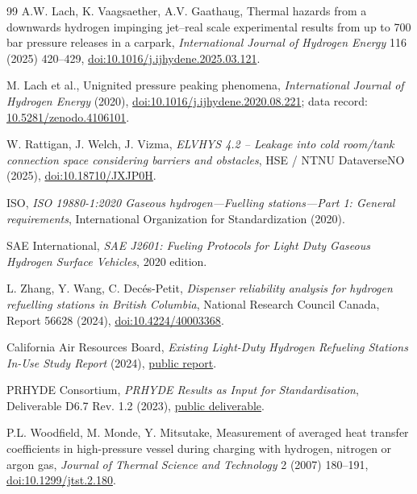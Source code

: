 \documentclass[12pt,a4paper]{article}
\begin{document}
\begin{thebibliography}{99}
A.W. Lach, K. Vaagsaether, A.V. Gaathaug, Thermal hazards from a downwards
hydrogen impinging jet--real scale experimental results from up to 700 bar
pressure releases in a carpark, \textit{International Journal of Hydrogen
Energy} 116 (2025) 420--429,
\href{https://doi.org/10.1016/j.ijhydene.2025.03.121}{doi:10.1016/j.ijhydene.2025.03.121}.

M. Lach et al., Unignited pressure peaking phenomena, \textit{International
Journal of Hydrogen Energy} (2020),
\href{https://doi.org/10.1016/j.ijhydene.2020.08.221}{doi:10.1016/j.ijhydene.2020.08.221};
data record: \href{https://doi.org/10.5281/zenodo.4106101}{10.5281/zenodo.4106101}.

W. Rattigan, J. Welch, J. Vizma, \textit{ELVHYS 4.2 -- Leakage into cold
room/tank connection space considering barriers and obstacles}, HSE / NTNU
DataverseNO (2025), \href{https://doi.org/10.18710/JXJP0H}{doi:10.18710/JXJP0H}.

ISO, \textit{ISO 19880-1:2020 Gaseous hydrogen---Fuelling stations---Part 1:
General requirements}, International Organization for Standardization (2020).

SAE International, \textit{SAE J2601: Fueling Protocols for Light Duty Gaseous
Hydrogen Surface Vehicles}, 2020 edition.

L. Zhang, Y. Wang, C. Dec\'es-Petit, \textit{Dispenser reliability analysis for
hydrogen refuelling stations in British Columbia}, National Research Council
Canada, Report 56628 (2024),
\href{https://doi.org/10.4224/40003368}{doi:10.4224/40003368}.

California Air Resources Board, \textit{Existing Light-Duty Hydrogen Refueling
Stations In-Use Study Report} (2024),
\href{https://ww2.arb.ca.gov/sites/default/files/2024-12/Existing\%20Light-Duty\%20Hydrogen\%20Refueling\%20Stations\%20In-Use\%20Study\%20Report\%20ADA\%20AL.pdf}{public report}.

PRHYDE Consortium, \textit{PRHYDE Results as Input for Standardisation},
Deliverable D6.7 Rev. 1.2 (2023),
\href{https://lbst.de/wp-content/uploads/2023/04/PRHYDE_Deliverable-D6-7_Results_as_Input_for_Standardisation_V1-2_final_Apr_2023.pdf}{public
deliverable}.

P.L. Woodfield, M. Monde, Y. Mitsutake, Measurement of averaged heat transfer
coefficients in high-pressure vessel during charging with hydrogen, nitrogen or
argon gas, \textit{Journal of Thermal Science and Technology} 2 (2007)
180--191,
\href{https://doi.org/10.1299/jtst.2.180}{doi:10.1299/jtst.2.180}.


\end{thebibliography}
\end{document}
